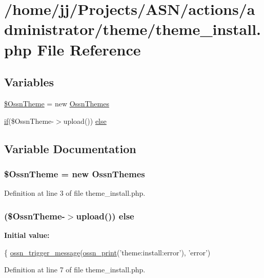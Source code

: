 \hypertarget{theme__install_8php}{}\section{/home/jj/\+Projects/\+A\+S\+N/actions/administrator/theme/theme\+\_\+install.php File Reference}
\label{theme__install_8php}
\subsection*{Variables}
\begin{DoxyCompactItemize}
\item 
\hyperlink{theme__install_8php_a79982f5326bb4d4c376f4ce14a613cfe}{\$\+Ossn\+Theme} = new \hyperlink{class_ossn_themes}{Ossn\+Themes}
\item 
\hyperlink{jquery_8tokeninput_8js_ad8dd46a3cbc004569e34401e9e71771a}{if}(\$Ossn\+Theme-\/$>$upload()) \hyperlink{theme__install_8php_aa70b46056a8357d3a43a5812009e308e}{else}
\end{DoxyCompactItemize}


\subsection{Variable Documentation}
\subsubsection[{\texorpdfstring{\$\+Ossn\+Theme}{$OssnTheme}}]{\setlength{\rightskip}{0pt plus 5cm}\$Ossn\+Theme = new {\bf Ossn\+Themes}}\hypertarget{theme__install_8php_a79982f5326bb4d4c376f4ce14a613cfe}{}\label{theme__install_8php_a79982f5326bb4d4c376f4ce14a613cfe}


Definition at line 3 of file theme\+\_\+install.\+php.

\subsubsection[{\texorpdfstring{else}{else}}]{ (\$Ossn\+Theme-\/$>$upload()) else}\hypertarget{theme__install_8php_aa70b46056a8357d3a43a5812009e308e}{}\label{theme__install_8php_aa70b46056a8357d3a43a5812009e308e}
{\bfseries Initial value\+:}
\begin{DoxyCode}
\{
    \hyperlink{ossn_8lib_8system_8php_ab3f23f23f32f50c12e7aea0ffaccaac7}{ossn\_trigger\_message}(\hyperlink{ossn_8lib_8languages_8php_a2be5d1c4b695593a9b9067b96df2150a}{ossn\_print}(\textcolor{stringliteral}{'theme:install:error'}), \textcolor{stringliteral}{'error'})
\end{DoxyCode}


Definition at line 7 of file theme\+\_\+install.\+php.

